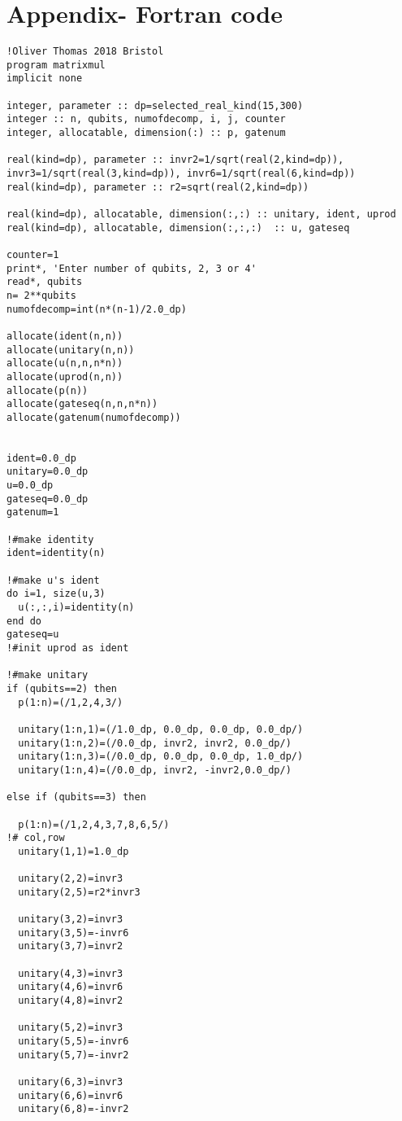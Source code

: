 \appendix
\section{Appendix- Fortran code}
\begin{verbatim}
!Oliver Thomas 2018 Bristol
program matrixmul
implicit none

integer, parameter :: dp=selected_real_kind(15,300)
integer :: n, qubits, numofdecomp, i, j, counter
integer, allocatable, dimension(:) :: p, gatenum

real(kind=dp), parameter :: invr2=1/sqrt(real(2,kind=dp)), invr3=1/sqrt(real(3,kind=dp)), invr6=1/sqrt(real(6,kind=dp))
real(kind=dp), parameter :: r2=sqrt(real(2,kind=dp)) 

real(kind=dp), allocatable, dimension(:,:) :: unitary, ident, uprod
real(kind=dp), allocatable, dimension(:,:,:)  :: u, gateseq

counter=1
print*, 'Enter number of qubits, 2, 3 or 4'
read*, qubits
n= 2**qubits
numofdecomp=int(n*(n-1)/2.0_dp)

allocate(ident(n,n))
allocate(unitary(n,n))
allocate(u(n,n,n*n))
allocate(uprod(n,n))
allocate(p(n))
allocate(gateseq(n,n,n*n))
allocate(gatenum(numofdecomp))


ident=0.0_dp
unitary=0.0_dp
u=0.0_dp
gateseq=0.0_dp
gatenum=1

!#make identity
ident=identity(n)

!#make u's ident 
do i=1, size(u,3)
  u(:,:,i)=identity(n)
end do
gateseq=u
!#init uprod as ident

!#make unitary
if (qubits==2) then 
  p(1:n)=(/1,2,4,3/)

  unitary(1:n,1)=(/1.0_dp, 0.0_dp, 0.0_dp, 0.0_dp/)
  unitary(1:n,2)=(/0.0_dp, invr2, invr2, 0.0_dp/)
  unitary(1:n,3)=(/0.0_dp, 0.0_dp, 0.0_dp, 1.0_dp/)
  unitary(1:n,4)=(/0.0_dp, invr2, -invr2,0.0_dp/)

else if (qubits==3) then

  p(1:n)=(/1,2,4,3,7,8,6,5/)
!# col,row
  unitary(1,1)=1.0_dp

  unitary(2,2)=invr3
  unitary(2,5)=r2*invr3

  unitary(3,2)=invr3
  unitary(3,5)=-invr6
  unitary(3,7)=invr2

  unitary(4,3)=invr3
  unitary(4,6)=invr6
  unitary(4,8)=invr2

  unitary(5,2)=invr3
  unitary(5,5)=-invr6
  unitary(5,7)=-invr2

  unitary(6,3)=invr3
  unitary(6,6)=invr6
  unitary(6,8)=-invr2


\end{verbatim}
